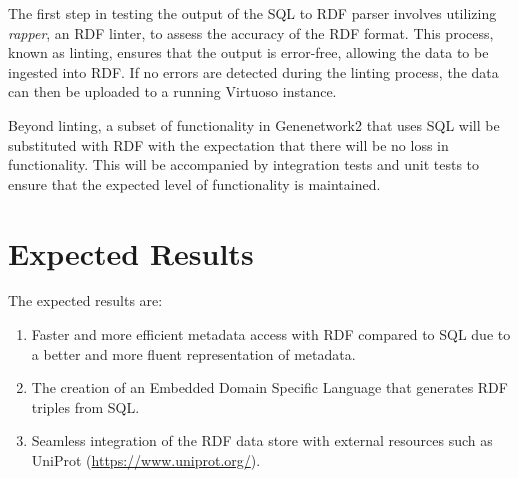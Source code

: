 The first step in testing the output of the SQL to RDF parser involves utilizing \textit{rapper}, an RDF linter, to assess the accuracy of the RDF format.  This process, known as linting, ensures that the output is error-free, allowing the data to be ingested into RDF.  If no errors are detected during the linting process, the data can then be uploaded to a running Virtuoso instance.

Beyond linting, a subset of functionality in Genenetwork2 that uses SQL will be substituted with RDF with the expectation that there will be no loss in functionality.  This will be accompanied by integration tests and unit tests to ensure that the expected level of functionality is maintained.

\clearpage
\section{Expected Results}
The expected results are:

\begin{enumerate}

\item Faster and more efficient metadata access with RDF compared to SQL due to a better and more fluent representation of metadata.

\item The creation of an Embedded Domain Specific Language that generates RDF triples from SQL.

\item Seamless integration of the RDF data store with external resources such as UniProt (\url{https://www.uniprot.org/}).
\end{enumerate}
